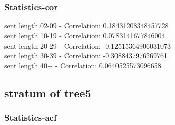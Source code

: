 \documentclass{article}%
\begin{document}
\begin{figure}[ht]%
\centering%
\setlength{\abovecaptionskip}{-35pt}%
%
%
\\%
%
%
\\%
%
\end{figure}

%
\newpage%
\subsubsection{Statistics{-}cor}%
\label{ssubsec:Statistics{-}cor}%
\noindent%
sent length 02-09 - Correlation: 0.18431208348457728\\%
sent length 10-19 - Correlation: 0.0783141677846004\\%
sent length 20-29 - Correlation: -0.12515364906031073\\%
sent length 30-39 - Correlation: -0.3088437976269761\\%
sent length 40+ - Correlation: 0.0640525573096658\\

%
\newpage

%
\subsection{stratum of tree5}%
\label{subsec:stratumoftree5}%
\subsubsection{Statistics{-}acf}%
\label{ssubsec:Statistics{-}acf}%
\end{document}
